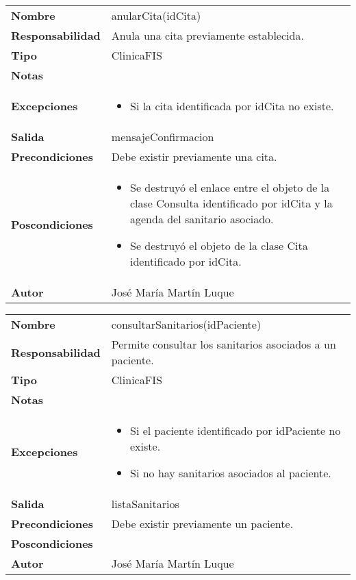 \documentclass[11pt,a4paper]{article}
\newenvironment{itemizenomargins}
    {\begin{minipage}[t]{1\linewidth}\begin{itemize}}
    {\end{itemize}\end{minipage}}
\begin{document}
\begin{table}[H]
	\centering
	\label{anular-cita}
	\begin{tabularx}{\textwidth}{l|X}
    \textbf{Nombre}          & anularCita(idCita)\\
		\textbf{Responsabilidad} & Anula una cita previamente establecida. \\
		\textbf{Tipo}            & ClinicaFIS \\
		\textbf{Notas}           &  \\
		\textbf{Excepciones}     & 
		\begin{itemizenomargins}
			\item Si la cita identificada por idCita no existe.
		\end{itemizenomargins} \\
		\textbf{Salida}          &  mensajeConfirmacion\\
		\textbf{Precondiciones}  &  Debe existir previamente una cita.\\
		\textbf{Poscondiciones}  & 
		\begin{itemizenomargins}
			\item Se destruyó el enlace entre el objeto de la clase Consulta identificado por idCita y la agenda del sanitario asociado.
			\item Se destruyó el objeto de la clase Cita identificado por idCita.
		\end{itemizenomargins} \\
		\textbf{Autor}			 & José María Martín Luque
	\end{tabularx}
\end{table}

\begin{table}[H]
	\centering
	\label{anular-cita}
	\begin{tabularx}{\textwidth}{l|X}
    \textbf{Nombre}          & consultarSanitarios(idPaciente)\\
		\textbf{Responsabilidad} & Permite consultar los sanitarios asociados a un paciente. \\
		\textbf{Tipo}            & ClinicaFIS \\
		\textbf{Notas}           &  \\
		\textbf{Excepciones}     & 
		\begin{itemizenomargins}
			\item Si el paciente identificado por idPaciente no existe.
      \item Si no hay sanitarios asociados al paciente.
		\end{itemizenomargins} \\
		\textbf{Salida}          &  listaSanitarios\\
		\textbf{Precondiciones}  &  Debe existir previamente un paciente.\\
		\textbf{Poscondiciones}  & \\
		\textbf{Autor}			 & José María Martín Luque
	\end{tabularx}
\end{table}
\end{document}
